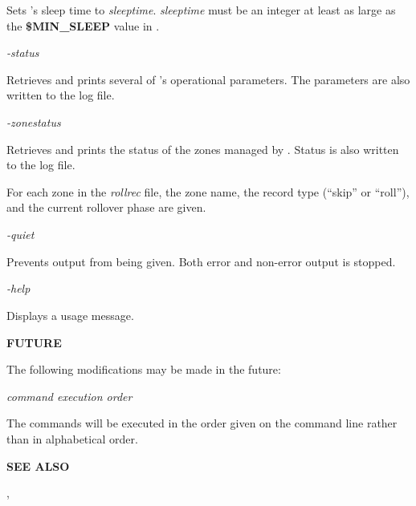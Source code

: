 \begin{description}
Sets 's sleep time to {\it sleeptime}.  {\it sleeptime} must be
an integer at least as large as the {\bf \$MIN\_SLEEP} value in .

\item {\it -status}\verb" "

Retrieves and prints several of 's operational parameters.
The parameters are also written to the log file.

\item {\it -zonestatus}\verb" "

Retrieves and prints the status of the zones managed by .
Status is also written to the log file.

For each zone in the {\it rollrec} file, the zone name, the record type
(``skip'' or ``roll''), and the current rollover phase are given.

\item {\it -quiet}\verb" "

Prevents output from being given.  Both error and non-error output is stopped.

\item {\it -help}\verb" "

Displays a usage message.

\end{description}

{\bf FUTURE}

The following modifications may be made in the future:

\begin{description}

\item {\it command execution order}\verb" "

The commands will be executed in the order given on the command line rather
than in alphabetical order.

\end{description}

{\bf SEE ALSO}


,
